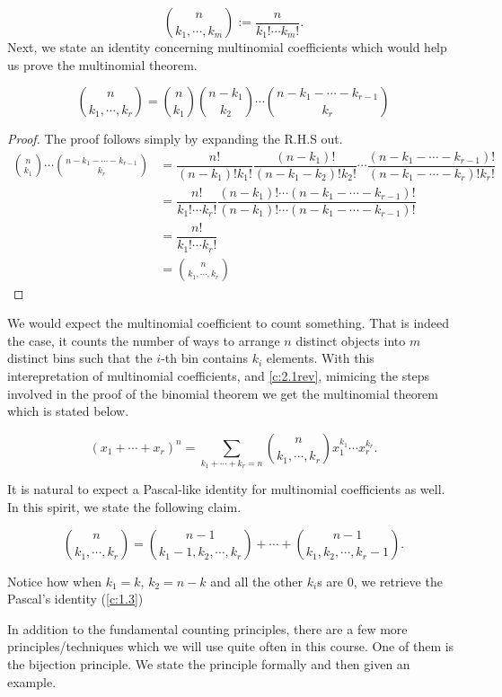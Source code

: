 \[\binom{n}{k_1,\cdots,k_m} := \frac{n}{k_1!\cdots k_m!}.\]
Next, we state an identity concerning multinomial coefficients which would help us prove the multinomial theorem. 
\begin{claim}
\[
\binom{n}{k_{1},\cdots,k_{r}} = \binom{n}{k_{1}}\binom{n-k_{1}}{k_{2}} \cdots \binom{n-k_{1}-\cdots-k_{r-1}}{k_{r}}
\]
\label{c:2.1rev}
\end{claim}
\begin{proof}
The proof follows simply by expanding the R.H.S out.
\begin{align*}
\binom{n}{k_{1}}\cdots \binom{n-k_{1}-\cdots-k_{r-1}}{k_{r}} &= \dfrac{n!}{(n-k_1)!k_1!}\dfrac{(n-k_1)!}{(n-k_1-k_2)!k_2!} \cdots \dfrac{(n-k_1-\cdots-k_{r-1})!}{(n-k_1-\cdots-k_{r})!k_r!} \\
&= \dfrac{n!}{k_1!\cdots k_r!}\dfrac{(n-k_1)!\cdots (n-k_1-\cdots-k_{r-1})!}{(n-k_1)!\cdots (n-k_1-\cdots-k_{r-1})!} \\
&=\dfrac{n!}{k_1!\cdots k_r!} \\
&=\binom{n}{k_1,\cdots,k_r}
\end{align*}
\end{proof}
We would expect the multinomial coefficient to count something. That is indeed the case, it counts the number of ways to arrange $n$ distinct objects into $m$ distinct bins such that the $i$-th bin contains $k_i$ elements. With this interepretation of multinomial coefficients, and \cref{c:2.1rev}, mimicing the steps involved in the proof of the binomial theorem we get the multinomial theorem which is stated below. 
\begin{theorem}
	\[
	(x_{1}+\cdots+x_{r})^n = \sum_{k_{1}+\cdots+k_{r}=n}\binom{n}{k_{1},\cdots,k_{r}}x_{1}^{k_{1}}\cdots x_{r}^{k_{r}}
	.\] 
\end{theorem}
It is natural to expect a Pascal-like identity for multinomial coefficients as well. In this spirit, we state the following claim.
\begin{claim}
	\[
		\binom{n}{k_{1},\cdots,k_{r}} = \binom{n-1}{k_1-1,k_2,\cdots,k_r} + \cdots + \binom{n-1}{k_1,k_2,\cdots,k_r-1}
	.\]
\end{claim}
\begin{remark}
Notice how when $k_1=k$, $k_2=n-k$ and all the other $k_i$s are $0$, we retrieve the Pascal's identity (\cref{c:1.3})    
\end{remark}
In addition to the fundamental counting principles, there are a few more principles/techniques which we will use quite often in this course. One of them is the bijection principle. We state the principle formally and then given an example.
